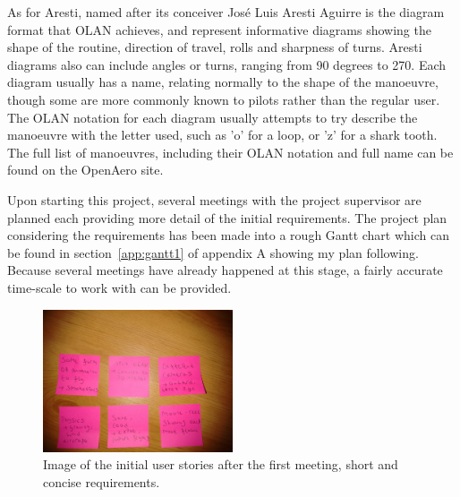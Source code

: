 As for Aresti, named after its conceiver José Luis Aresti Aguirre\cite{Aresti} is the diagram format that OLAN achieves, and represent informative diagrams showing the shape of the routine, direction of travel, rolls and sharpness of turns. Aresti diagrams also can include angles or turns, ranging from 90 degrees to 270. Each diagram usually has a name\cite{Aresti_Simple}, relating normally to the shape of the manoeuvre, though some are more commonly known to pilots rather than the regular user. The OLAN notation for each diagram usually attempts to try describe the manoeuvre with the letter used, such as 'o' for a loop, or 'z' for a shark tooth. The full list of manoeuvres, including their OLAN notation and full name can be found on the OpenAero\cite{OpenAero_Language} site.

Upon starting this project, several meetings with the project supervisor are planned each providing more detail of the initial requirements. The project plan considering the requirements has been made into a rough Gantt chart which can be found in section~\ref{app:gantt1} of appendix A showing my plan following. Because several meetings have already happened at this stage, a fairly accurate time-scale to work with can be provided.\\

\begin{figure}[h!]
  \centering
      \includegraphics[width=0.5\textwidth]{images/notes.jpg}
  \caption{Image of the initial user stories after the first meeting, short and concise requirements.}
\end{figure}

